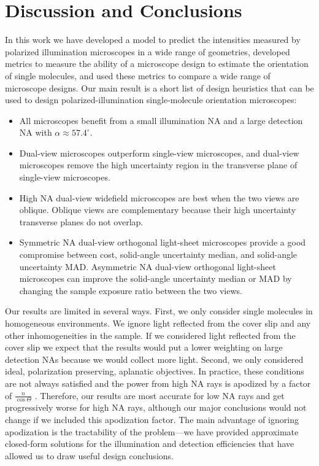 \documentclass[10pt]{article}
\begin{document}
\section{Discussion and Conclusions}\label{discussion}
In this work we have developed a model to predict the intensities measured by
polarized illumination microscopes in a wide range of geometries, developed
metrics to measure the ability of a microscope design to estimate the
orientation of single molecules, and used these metrics to compare a wide
range of microscope designs. Our main result is a short list of design
heuristics that can be used to design polarized-illumination single-molecule
orientation microscopes:
\begin{itemize}
\item All microscopes benefit from a small illumination NA and a large detection
  NA with $\alpha \approx 57.4^{\circ}$.
\item Dual-view microscopes outperform single-view microscopes, and dual-view
  microscopes remove the high uncertainty region in the transverse plane of
  single-view microscopes.
\item High NA dual-view widefield microscopes are best when the two views are
  oblique. Oblique views are complementary because their high uncertainty
  transverse planes do not overlap.
\item Symmetric NA dual-view orthogonal light-sheet microscopes provide a good
  compromise between cost, solid-angle uncertainty median, and solid-angle
  uncertainty MAD. Asymmetric NA dual-view orthogonal light-sheet microscopes
  can improve the solid-angle uncertainty median or MAD by changing the sample
  exposure ratio between the two views.
\end{itemize}

Our results are limited in several ways. First, we only consider single
molecules in homogeneous environments. We ignore light reflected from the cover
slip and any other inhomogeneities in the sample. If we considered light
reflected from the cover slip we expect that the results would put a lower
weighting on large detection NAs because we would collect more light. Second, we
only considered ideal, polarization preserving, aplanatic objectives. In
practice, these conditions are not always satisfied and the power from high NA
rays is apodized by a factor of $\frac{n}{\cos\Theta}$
\cite{nov2006}. Therefore, our results are most accurate for low NA rays and get
progressively worse for high NA rays, although our major conclusions would not
change if we included this apodization factor. The main advantage of ignoring
apodization is the tractability of the problem---we have provided approximate
closed-form solutions for the illumination and detection efficiencies that have
allowed us to draw useful design conclusions.
\end{document}
